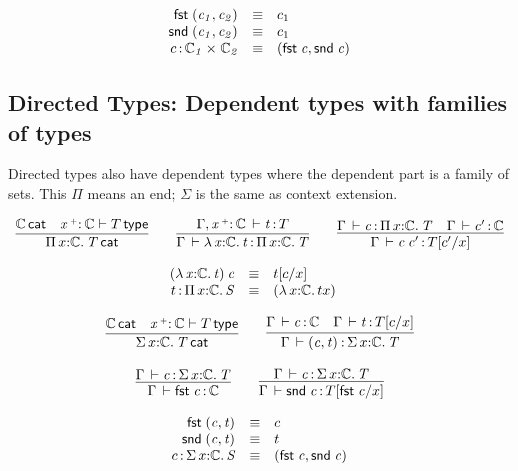 \documentclass[11pt]{article}
\theoremstyle{plain}
\begin{document}
\[
\begin{array}{rcll}
\mathit{\mathsf{fst}_{} \: \mathit{(c_1,c_2)_{}}} & \equiv & c_1 \\
\mathit{\mathsf{snd}_{} \: \mathit{(c_1,c_2)_{}}} & \equiv & c_1 \\
c \, \mathit{:} \, \mathit{\mathbb{C}_1} \times_{\mathit{}} \mathit{\mathbb{C}_2} & \equiv & \mathit{(\mathit{\mathsf{fst}_{} \: c},\mathit{\mathsf{snd}_{} \: c})_{}}
\end{array}
\]

\subsection{Directed Types: Dependent types with families of types}

Directed types also have dependent types where the dependent part is a
family of sets.  This $\Pi$ means an end; $\Sigma$ is the same as
context extension.  

\[
\begin{array}{c}
\infer{\wfdtp{\picl{x}{\C}{T}}}
      {\wfdtp{\C} &
       \wftp{\vptptm{x}{\co}{\C}}{T}}
\qquad
\infer{\ofdtp{\Gamma}{\lam{x}{\C}{t}}{\picl x \C T}}
      {\oftp{\Gamma,\vtptm{x}{\co}{\C}}{t}{T}}
\qquad
\infer{\oftp{\Gamma}{\app c {c'}}{\subst T {c'} x}}
      {\oftp{\Gamma}{c}{\picl{x}{\C}{T}} &
        \oftp{\Gamma}{c'}{\C}}
\end{array}
\]

\[
\begin{array}{rcll}
\mathit{({\lambda\,x \mathit{:} \mathbb{C}.\,t}) \: c} & \equiv & t [ c / x ] \\
t \, \mathit{:} \, \textnormal{$\Pi$}\,x \mathit{:} \mathbb{C}.\,\mathit{S} & \equiv & {({\lambda\,x \mathit{:} \mathbb{C}.\,t}{x})} &
\end{array} \\
\]

\[
\begin{array}{c}
\infer{\wfdtp{\sigmacl{x}{\C}{T}}}
      {\wfdtp{\C} &
        \wftp{\vtptm{x}{\co}{\C}}{T}}
\qquad
\infer{\ofdtp{\Gamma}{\pair{c}{t}}{\sigmacl x \C T}}
      {\ofdtp{\Gamma}{c}{\C} &
       \ofdtp{\Gamma}{t}{\subst{T}{c}{x}}}
\\ \\
\infer{\ofdtp{\Gamma}{\fst c}{\C}}
      {\ofdtp{\Gamma}{c}{\sigmacl{x}{\C}{T}}}
\qquad
\infer{\ofdtp{\Gamma}{\snd c}{\subst{T}{\fst c}{x}}}
      {\ofdtp{\Gamma}{c}{\sigmacl{x}{\C}{T}}}
\end{array}
\]

\[
\begin{array}{rcll}
\mathit{\mathsf{fst}_{} \: \mathit{(c,t)_{}}} & \equiv & c \\
\mathit{\mathsf{snd}_{} \: \mathit{(c,t)_{}}} & \equiv & t \\
c \, \mathit{:} \, \textnormal{$\Sigma$}\,x \mathit{:} \mathbb{C}.\,\mathit{S} & \equiv & \mathit{(\mathit{\mathsf{fst}_{} \: c},\mathit{\mathsf{snd}_{} \: c})_{}}
\end{array}
\]
\end{document}
